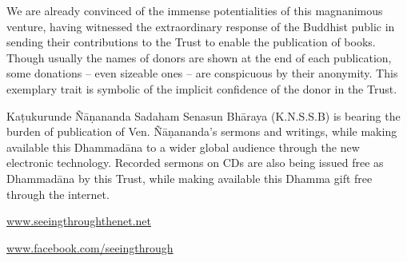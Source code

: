 We are already convinced of the immense potentialities of this magnanimous venture, having witnessed the extraordinary response of the Buddhist public in sending their contributions to the Trust to enable the publication of books. Though usually the names of donors are shown at the end of each publication, some donations -- even sizeable ones -- are conspicuous by their anonymity. This exemplary trait is symbolic of the implicit confidence of the donor in the Trust.

Kaṭukurunde Ñāṇananda Sadaham Senasun Bhāraya (K.N.S.S.B) is bearing the burden of publication of Ven. Ñāṇananda's sermons and writings, while making available this Dhammadāna to a wider global audience through the new electronic technology. Recorded sermons on CDs are also being issued free as Dhammadāna by this Trust, while making available this Dhamma gift free through the internet.

\href{https://seeingthroughthenet.net/}{www.seeingthroughthenet.net}

\href{https://www.facebook.com/seeingthrough}{www.facebook.com/seeingthrough}
